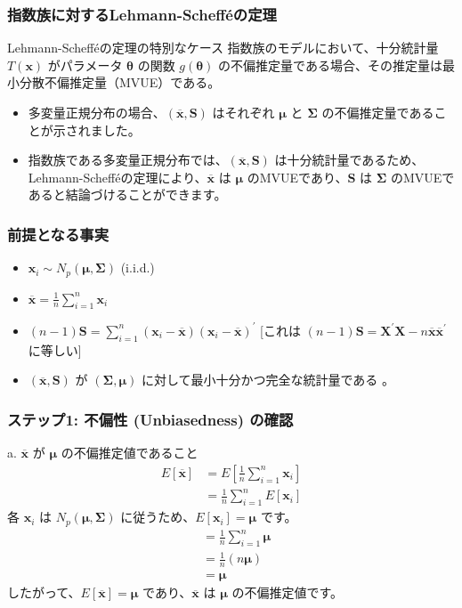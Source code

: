 \documentclass{beamer}
\begin{document}
\begin{frame}
\frametitle{指数族に対するLehmann-Schefféの定理}
\begin{block}{Lehmann-Schefféの定理の特別なケース}
指数族のモデルにおいて、十分統計量 $T(\bm{x})$ がパラメータ $\bm{\theta}$ の関数 $g(\bm{\theta})$ の不偏推定量である場合、その推定量は最小分散不偏推定量（MVUE）である。
\end{block}
\begin{itemize}
    \item 多変量正規分布の場合、$(\overline{\bm{x}},\bm{S})$ はそれぞれ $\bm{\mu}$ と $\bm{\Sigma}$ の不偏推定量であることが示されました。
    \item 指数族である多変量正規分布では、$(\overline{\bm{x}},\bm{S})$ は十分統計量であるため、Lehmann-Schefféの定理により、$\overline{\bm{x}}$ は $\bm{\mu}$ のMVUEであり、$\bm{S}$ は $\bm{\Sigma}$ のMVUEであると結論づけることができます。
\end{itemize}
\end{frame}

\begin{frame}
\frametitle{前提となる事実}
\begin{itemize}
    \item $\bm{x}_i \sim N_p(\bm{\mu},\bm{\Sigma})$ (i.i.d.) 
    \item $\overline{\bm{x}} = \frac{1}{n}\sum_{i=1}^{n}\bm{x}_i$ 
    \item $(n-1)\bm{S}=\sum_{i=1}^{n}(\bm{x}_i-\overline{\bm{x}})(\bm{x}_i-\overline{\bm{x}})^{\prime}$ [これは $(n-1)\bm{S}=\bm{X}^{\prime}\bm{X}-n\overline{\bm{x}}\overline{\bm{x}}^{\prime}$ に等しい]
    \item $(\overline{\bm{x}},\bm{S})$ が $(\bm{\Sigma},\bm{\mu})$ に対して最小十分かつ完全な統計量である  。
\end{itemize}
\end{frame}

\begin{frame}
\frametitle{ステップ1: 不偏性 (Unbiasedness) の確認}
\begin{block}{a. $\overline{\bm{x}}$ が $\bm{\mu}$ の不偏推定値であること}
\begin{align*}
E[\overline{\bm{x}}] &= E\left[\frac{1}{n}\sum_{i=1}^{n}\bm{x}_i\right] \\
&= \frac{1}{n}\sum_{i=1}^{n}E[\bm{x}_i]
\end{align*}
各 $\bm{x}_i$ は $N_p(\bm{\mu},\bm{\Sigma})$ に従うため、$E[\bm{x}_i]=\bm{\mu}$ です。
\begin{align*}
&= \frac{1}{n}\sum_{i=1}^{n}\bm{\mu} \\
&= \frac{1}{n}(n\bm{\mu}) \\
&= \bm{\mu}
\end{align*}
したがって、$E[\overline{\bm{x}}]=\bm{\mu}$ であり、$\overline{\bm{x}}$ は $\bm{\mu}$ の不偏推定値です。
\end{block}
\end{frame}
\end{document}
